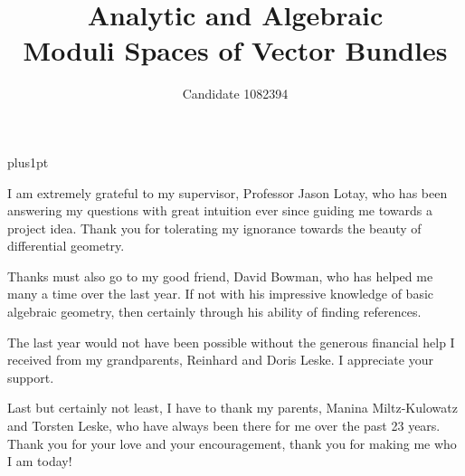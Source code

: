 \documentclass[12pt]{ociamthesis}  %
\title{Analytic and Algebraic\\[1ex]Moduli Spaces of Vector Bundles}   %
\author{Candidate 1082394}             %
\begin{document}
\baselineskip=18pt plus1pt

\setcounter{secnumdepth}{3}
\setcounter{tocdepth}{3}


\maketitle                  %

\begin{acknowledgements}
  I am extremely grateful to my supervisor, Professor Jason Lotay,
  who has been answering my questions with great intuition ever since
  guiding me towards a project idea. Thank you for tolerating my
  ignorance towards the beauty of differential geometry.

  Thanks must also go to my good friend, David Bowman, who has
  helped me many a time over the last year. If not with his
  impressive knowledge of basic algebraic geometry, then certainly
  through his ability of finding references.

  The last year would not have been possible without the generous
  financial help I received from my grandparents, Reinhard and
  Doris Leske. I appreciate your support.

  Last but certainly not least, I have to thank my parents,
  Manina Miltz-Kulowatz and Torsten Leske, who have always been there for
  me over the past 23 years. Thank you for your love and your
  encouragement, thank you for making me who I am today!
\end{acknowledgements}
\end{document}
